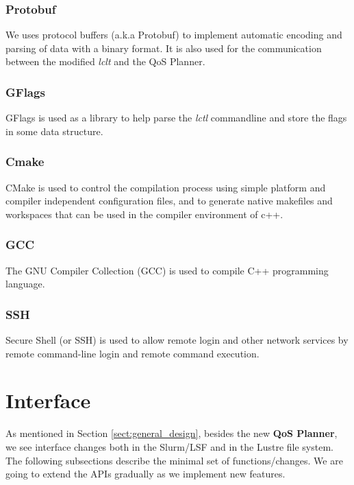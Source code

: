 \documentclass[10pt]{article}
\begin{document}
\subsubsection{Protobuf}
We uses protocol buffers (a.k.a Protobuf) to implement automatic encoding and parsing of data with a binary format. It is also used for the communication between the modified \emph{lclt} and the QoS Planner.

\subsubsection{GFlags}
GFlags is used as a library to help parse the \emph{lctl} commandline and store the flags in some data structure.

\subsubsection{Cmake}
CMake is used to control the compilation process using simple platform and compiler independent configuration files, and to generate native makefiles and workspaces that can be used in the compiler environment of c++.

\subsubsection{GCC}
The GNU Compiler Collection (GCC) is used to compile C++ programming language.

\subsubsection{SSH}
Secure Shell (or SSH) is used to allow remote login and other network services by remote command-line login and remote command execution.

\section{Interface}

As mentioned in Section \ref{sect:general_design}, besides the new \textbf{QoS Planner}, we see interface changes both in the Slurm/LSF and in the Lustre file system.
The following subsections describe the minimal set of functions/changes.
We are going to extend the APIs gradually as we implement new features.
\end{document}
